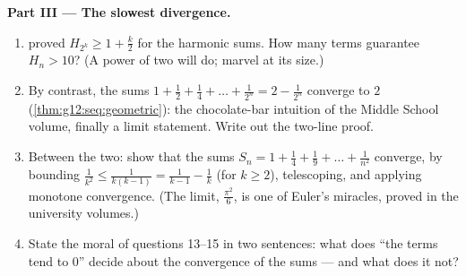 \begin{problem}
\medskip
\noindent\textbf{Part III --- The slowest divergence.}
\begin{enumerate}[resume]
  \item {} proved
        $H_{2^k} \geq 1 + \frac k2$ for the harmonic sums. How
        many terms guarantee $H_n > 10$? (A power of two will
        do; marvel at its size.)
  \item By contrast, the  sums
        $1 + \frac12 + \frac14 + \dots + \frac{1}{2^n} =
        2 - \frac{1}{2^n}$ converge to $2$
        (\cref{thm:g12:seq:geometric}): the chocolate-bar
        intuition of the Middle School volume, finally a limit
        statement. Write out the two-line proof.
  \item Between the two: show that the sums
        $S_n = 1 + \frac{1}{4} + \frac{1}{9} + \dots +
        \frac{1}{n^2}$ converge, by bounding
        $\frac{1}{k^2} \leq \frac{1}{k(k-1)} =
        \frac{1}{k-1} - \frac{1}{k}$ (for $k \geq 2$),
        telescoping, and applying monotone convergence. (The
        limit, $\frac{\pi^2}{6}$, is one of Euler's miracles,
        proved in the university volumes.)
  \item State the moral of questions 13--15 in two sentences:
        what does ``the terms tend to $0$'' decide about the
        convergence of the sums --- and what does it not?
\end{enumerate}


\end{problem}
